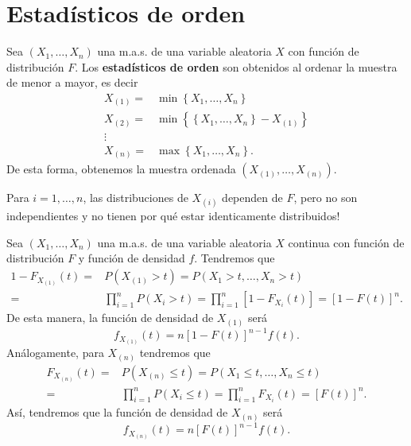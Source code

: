 \section{Estadísticos de orden}
Sea $\displaystyle \left(X_{1}, \ldots, X_{n}\right) $ una m.a.s. de una variable aleatoria $\displaystyle X $ con función de distribución $\displaystyle F $. Los \textbf{estadísticos de orden} son obtenidos al ordenar la muestra de menor a mayor, es decir
\[
\begin{split}
	X_{\left(1\right)}= &\min \left\{ X_{1}, \ldots, X_{n}\right\} \\
	X_{\left(2\right)}=& \min \left\{ \left\{ X_{1}, \ldots, X_{n}\right\} -X_{\left(1\right)}\right\}  \\
	\vdots \\
	X_{\left(n\right)} = & \max \left\{ X_{1}, \ldots, X_{n}\right\} .
\end{split}
\]
De esta forma, obtenemos la muestra ordenada $\displaystyle \left(X_{\left(1\right)}, \ldots, X_{\left(n\right)}\right) $. 
\begin{observation}[IMPORTANTE]
	Para $\displaystyle i = 1, \ldots, n $, las distribuciones de $\displaystyle X_{\left(i\right)} $ dependen de $\displaystyle F $, pero no son independientes y no tienen por qué estar identicamente distribuidos!
\end{observation}
\begin{eg}
Sea $\displaystyle \left(X_{1}, \ldots, X_{n}\right) $ una m.a.s. de una variable aleatoria $\displaystyle X $ continua con función de distribución $\displaystyle F $ y función de densidad $\displaystyle f $. Tendremos que 
\[
\begin{split}
	1 - F_{X_{\left(1\right)}}\left(t\right)= & P\left(X_{\left(1\right)} > t\right)=P\left(X_{1} > t, \ldots, X_{n} > t\right) \\
	= &  \prod^{n}_{i=1}P\left(X_{i} > t\right) = \prod^{n}_{i=1}\left[1-F_{X_{i}}\left(t\right)\right] = \left[1-F\left(t\right)\right] ^{n}.
\end{split}
\]
De esta manera, la función de densidad de $\displaystyle X_{\left(1\right)} $ será
\[f_{X_{\left(1\right)}}\left(t\right)=n\left[1-F\left(t\right)\right] ^{n-1}f\left(t\right) .\]
Análogamente, para $\displaystyle X_{\left(n\right)} $ tendremos que 
\[
\begin{split}
	F_{X_{\left(n\right)}}\left(t\right)= & P\left(X_{\left(n\right)} \leq t\right) = P\left(X_{1} \leq t, \ldots, X_{n} \leq t\right) \\
	= &  \prod^{n}_{i=1}P\left(X_{i}\leq t\right) = \prod^{n}_{i=1}F_{X_{i}}\left(t\right) = \left[F\left(t\right)\right] ^{n}.
\end{split}
\]
Así, tendremos que la función de densidad de $\displaystyle X_{\left(n\right)} $ será
\[f_{X_{\left(n\right)}}\left(t\right) = n\left[F\left(t\right)\right] ^{n-1}f\left(t\right) .\]
\end{eg}
